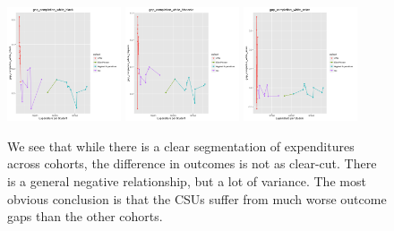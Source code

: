 \documentclass{article}
\begin{document}
\begin{figure}[H]
\centering
\includegraphics[width=0.3\textwidth]{../images/eda_scatterplots/gap_completion_white_black_cohort.png}
\includegraphics[width=0.3\textwidth]{../images/eda_scatterplots/gap_completion_white_hispanic_cohort.png}
\includegraphics[width=0.3\textwidth]{../images/eda_scatterplots/gap_completion_white_asian_cohort.png}
\caption{\label{fig: CompletionRatesCohorts} We see that while there is a clear segmentation of expenditures across cohorts, the difference in outcomes is not as clear-cut. There is a general negative relationship, but a lot of variance. The most obvious conclusion is that the CSUs suffer from much worse outcome gaps than the other cohorts.}
\end{figure}
\end{document}

